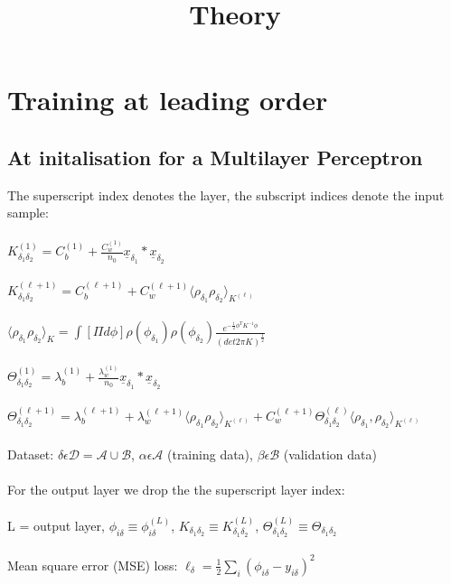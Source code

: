 \documentclass{article}
\title{Theory}
\author{}
\begin{document}
\section{Training at leading order}
\subsection{At initalisation for a Multilayer Perceptron}
The superscript index denotes the layer, the subscript indices denote the input sample:\\ \\
$K^{(1)}_{\delta_1\delta_2} = C^{(1)}_b + \frac{C^{(1)}_w }{n_0} \underline{x}_{\delta_1} * \underline{x}_{\delta_2}$
\\
\\
$K^{(\ell +1)}_{\delta_1\delta_2} = C^{(\ell +1)}_b + C^{(\ell +1)}_w \langle \rho_{\delta_1} \rho_{\delta_2} \rangle _{K^{(\ell)}}$
\\
\\
$\langle \rho_{\delta_1} \rho_{\delta_2} \rangle _K = \int[\Pi d\phi]   \rho(\phi_{\delta_1}) \rho(\phi_{\delta_2}) \frac{e^{ -\frac{1}{2}\phi^{T}K^{-1}\phi}}{(det 2 \pi K)^{\frac{1}{2}} } $
\\
\\
$\Theta^{(1)}_{\delta_1\delta_2} = \lambda^{(1)}_b + \frac{\lambda^{(1)}_w }{n_0} \underline{x}_{\delta_1} * \underline{x}_{\delta_2}$
\\
\\
$\Theta^{(\ell +1)}_{\delta_1\delta_2} = \lambda^{(\ell +1)}_b + \lambda^{(\ell +1)}_w  \langle \rho_{\delta_1} \rho_{\delta_2} \rangle _{K^{(\ell)}} + C^{(\ell +1)}_w  \Theta^{(\ell)}_{\delta_1\delta_2} \langle \rho_{\delta_1}, \rho_{\delta_2} \rangle _{K^{(\ell)}}$
\\
\\
Dataset: $\delta \epsilon \mathcal{D} = \mathcal{A} \cup \mathcal{B}$, $\alpha \epsilon \mathcal{A}$ (training data), $\beta \epsilon \mathcal{B}$ (validation data)
\\
\\
For the output layer we drop the the superscript layer index:\\ \\
L = output layer, $\phi_{i\delta} \equiv \phi^{(L)}_{i\delta} $, $K_{\delta_1\delta_2} \equiv K^{(L)}_{\delta_1\delta_2} $, $\Theta^{(L)}_{\delta_1\delta_2} \equiv \Theta_{\delta_1\delta_2}$
\\
\\
Mean square error (MSE) loss: $\ell_\delta=\frac{1}{2} \sum_{i}(\phi_{i\delta}-y_{i\delta})^2$
\end{document}
